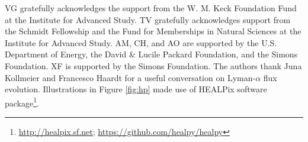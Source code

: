 \acknowledgements

VG gratefully acknowledges the support from the W. M. Keck Foundation Fund at the Institute for Advanced Study. TV gratefully acknowledges support from the Schmidt Fellowship and the Fund for Memberships in Natural Sciences at the Institute for Advanced Study. AM, CH, and AO are supported by the U.S. Department of Energy, the David \& Lucile Packard Foundation, and the Simons Foundation. XF is supported by the Simons Foundation. The authors thank Juna Kollmeier and Francesco Haardt for a useful conversation on Lyman-$\alpha$ flux evolution. Illustrations in Figure \ref{fig:hp} made use of HEALPix \cite{2005ApJ...622..759G} software package\footnote{\url{ http://healpix.sf.net}; \url{https://github.com/healpy/healpy}}.